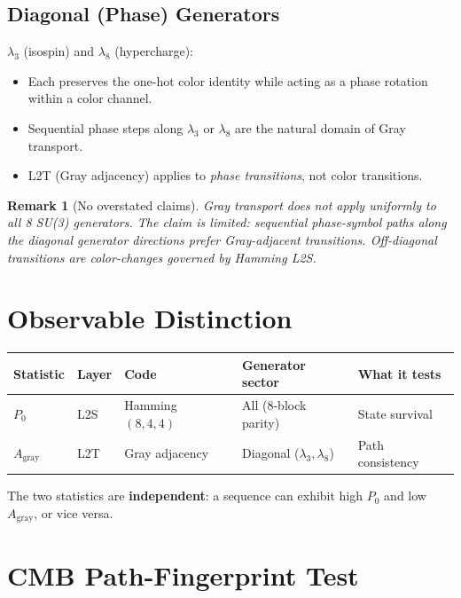 \documentclass[11pt]{article}
\newtheorem{remark}{Remark}
\begin{document}
\subsection{Diagonal (Phase) Generators}

$\lambda_3$ (isospin) and $\lambda_8$ (hypercharge):

\begin{itemize}
\item Each preserves the one-hot color identity while acting as a phase rotation
within a color channel.
\item Sequential phase steps along $\lambda_3$ or $\lambda_8$ are the natural
domain of Gray transport.
\item L2T (Gray adjacency) applies to \emph{phase transitions}, not color
transitions.
\end{itemize}

\begin{remark}[No overstated claims]
Gray transport does not apply uniformly to all 8 SU(3) generators.
The claim is limited: \emph{sequential phase-symbol paths along the diagonal
generator directions prefer Gray-adjacent transitions}.
Off-diagonal transitions are color-changes governed by Hamming L2S.
\end{remark}

\section{Observable Distinction}

\begin{center}
\begin{tabular}{lllll}
\hline
Statistic & Layer & Code & Generator sector & What it tests \\
\hline
$P_0$ & L2S & Hamming $(8,4,4)$ & All (8-block parity) & State survival \\
$A_{\mathrm{gray}}$ & L2T & Gray adjacency & Diagonal ($\lambda_3,\lambda_8$) & Path consistency \\
\hline
\end{tabular}
\end{center}

The two statistics are \textbf{independent}: a sequence can exhibit high $P_0$
and low $A_{\mathrm{gray}}$, or vice versa.

\section{CMB Path-Fingerprint Test}
\end{document}
